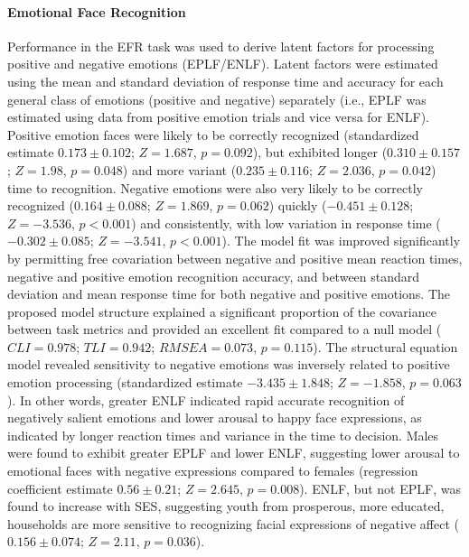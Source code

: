 \documentclass[utf8]{frontiersSCNS} %
\begin{document}
\paragraph{Emotional Face Recognition} Performance in the EFR task was used to derive latent factors for processing positive and negative emotions (EPLF/ENLF). Latent factors were estimated using the mean and standard deviation of response time and accuracy for each general class of emotions (positive and negative) separately (i.e., EPLF was estimated using data from positive emotion trials and vice versa for ENLF). Positive emotion faces were likely to be correctly recognized (standardized estimate $0.173\pm0.102$; $Z=1.687$, $p=0.092$), but exhibited longer ($0.310\pm0.157$; $Z=1.98$, $p=0.048$) and more variant ($0.235\pm0.116$; $Z=2.036$, $p=0.042$) time to recognition. Negative emotions were also very likely to be correctly recognized ($0.164\pm0.088$; $Z=1.869$, $p=0.062$) quickly ($-0.451\pm0.128$; $Z=-3.536$, $p<0.001$) and consistently, with low variation in response time ($-0.302\pm0.085$; $Z=-3.541$, $p<0.001$). The model fit was improved significantly by permitting free covariation between negative and positive mean reaction times, negative and positive emotion recognition accuracy, and between standard deviation and mean response time for both negative and positive emotions. The proposed model structure explained a significant proportion of the covariance between task metrics and provided an excellent fit compared to a null model ($CLI = 0.978$; $TLI = 0.942$; $RMSEA = 0.073$, $p = 0.115$). The structural equation model revealed sensitivity to negative emotions was inversely related to positive emotion processing (standardized estimate $-3.435\pm1.848$; $Z=-1.858$, $p = 0.063$). In other words, greater ENLF indicated rapid accurate recognition of negatively salient emotions and lower arousal to happy face expressions, as indicated by longer reaction times and variance in the time to decision. Males were found to exhibit greater EPLF and lower ENLF, suggesting lower arousal to emotional faces with negative expressions compared to females (regression coefficient estimate $0.56\pm0.21$; $Z=2.645$, $p = 0.008$). ENLF, but not EPLF, was found to increase with SES, suggesting youth from prosperous, more educated, households are more sensitive to recognizing facial expressions of negative affect ($0.156\pm0.074$; $Z=2.11$, $p = 0.036$). 
\end{document}
